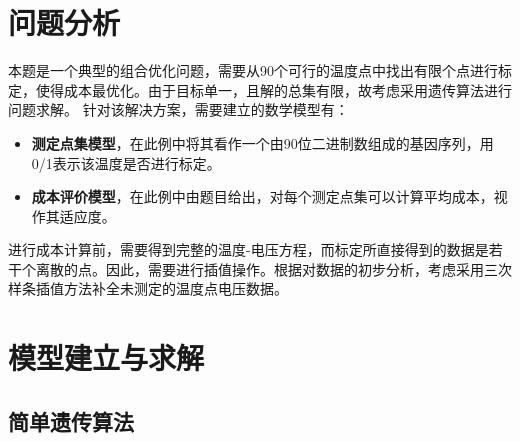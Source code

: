 \documentclass[withoutpreface,bwprint]{cumcmthesis} %
\begin{document}
\section{问题分析}
本题是一个典型的组合优化问题，需要从90个可行的温度点中找出有限个点进行标定，使得成本最优化。由于目标单一，且解的总集有限，故考虑采用遗传算法进行问题求解。
\newpage
针对该解决方案，需要建立的数学模型有：
\begin{itemize}
    \item \textbf{测定点集模型}，在此例中将其看作一个由90位二进制数组成的基因序列，用0/1表示该温度是否进行标定。
    \item \textbf{成本评价模型}，在此例中由题目给出，对每个测定点集可以计算平均成本，视作其适应度。
\end{itemize}

进行成本计算前，需要得到完整的温度-电压方程，而标定所直接得到的数据是若干个离散的点。因此，需要进行插值操作。根据对数据的初步分析，考虑采用三次样条插值方法补全未测定的温度点电压数据。

\section{模型建立与求解}
\subsection{简单遗传算法}
\end{document}
